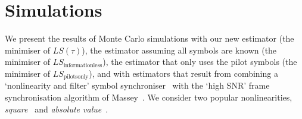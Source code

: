\documentclass[journal]{IEEEtranTCOM}
\begin{document}




\section{Simulations}\label{sec:simulations}

We present the results of Monte Carlo simulations with our new estimator (the minimiser of $LS(\tau)$), the estimator assuming all symbols are known (the minimiser of $LS_{\text{informationless}}$), the estimator that only uses the pilot symbols (the minimiser of $LS_{\text{pilotsonly}}$), and with estimators that result from combining a `nonlinearity and filter' symbol synchroniser~\cite{Oerder_synch_square_circstat_1988,Morelli_symbtime_feedforward_1997,Panayirci_eval_per_symbtim_1996} with the `high SNR' frame synchronisation algorithm of Massey~\cite{Massey1972optimumframe}\cite[Equation 3.29]{Robertson_frame_sync_phd_1995}.  We consider two popular nonlinearities, \emph{square}~\cite{Oerder_synch_square_circstat_1988} and \emph{absolute value}~\cite{Panayirci_eval_per_symbtim_1996}.  %
\end{document}
